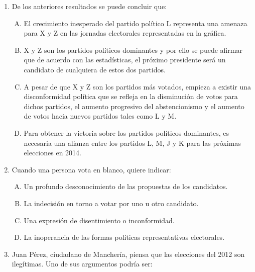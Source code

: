 \begin{enumerate}

\newpage
\item De los anteriores resultados se puede concluir que:\label{socandres-20}

\begin{enumerate}[(A)]
\item El crecimiento inesperado del partido político L representa una amenaza para X y Z en las jornadas electorales representadas en la gráfica.
\item X y Z son los partidos políticos dominantes y por ello se puede afirmar que de acuerdo con las estadísticas, el próximo presidente será un candidato de cualquiera de estos dos partidos.
\item A pesar de que X y Z son los partidos más votados, empieza a existir una disconformidad política que se refleja en la disminución de votos para dichos partidos, el aumento progresivo del abstencionismo y el aumento de votos hacia nuevos partidos tales como L y M.
\item Para obtener la victoria sobre los partidos políticos dominantes, es necesaria una alianza entre los partidos L, M, J y K para las próximas elecciones en 2014.   

\end{enumerate}

\item Cuando una persona vota en blanco, quiere indicar:\label{socandres-21}

\begin{enumerate}[(A)]
\item Un profundo desconocimiento de las propuestas de los candidatos.
\item La indecisión en torno a votar por uno u otro candidato.
\item Una expresión de disentimiento o inconformidad.
\item La inoperancia de las formas políticas representativas electorales.

\end{enumerate}

\newpage
\item Juan Pérez, ciudadano de Manchería, piensa que las elecciones del 2012 son ilegítimas. Uno de sus argumentos podría ser:\label{socandres-22}


\end{enumerate}
